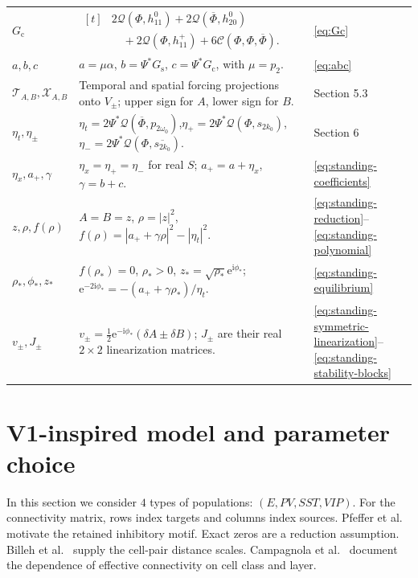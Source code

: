 \documentclass[11pt]{article}
\newcommand{\ii}{\mathrm{i}}
\newcommand{\ee}{\mathrm{e}}
\newcommand{\cQ}{\mathcal{Q}}
\newcommand{\cC}{\mathcal{C}}
\begin{document}
\begin{minipage}{\textwidth}
\begin{tabular}{@{}p{}p{}p{}@{}}
$G_{\mathrm{c}}$ & $\begin{aligned}[t]&2\cQ(\Phi,h_{11}^0)+2\cQ(\overline\Phi,h_{20}^0)\\
&\quad+2\cQ(\Phi,h_{11}^+)+6\cC(\Phi,\Phi,\overline\Phi).\end{aligned}$ & \eqref{eq:Gc} \\
$a,b,c$ & $a=\mu\alpha$, $b=\Psi^*G_{\mathrm{s}}$, $c=\Psi^*G_{\mathrm{c}}$, with $\mu=p_2$. & \eqref{eq:abc} \\
$\mathcal T_{A,B},\mathcal X_{A,B}$ & Temporal and spatial forcing projections onto $V_\pm$; upper sign for $A$, lower sign for $B$. & Section 5.3 \\
$\eta_t,\eta_\pm$ & $\eta_t=2\Psi^*\cQ(\overline\Phi,p_{2\omega_0})$,\newline $\eta_+=2\Psi^*\cQ(\Phi,s_{2k_0})$, $\eta_-=2\Psi^*\cQ(\Phi,\overline{s_{2k_0}})$. & Section 6 \\
$\eta_x,a_+,\gamma$ & $\eta_x=\eta_+=\eta_-$ for real $S$; $a_+=a+\eta_x$, $\gamma=b+c$. & \eqref{eq:standing-coefficients} \\
$z,\rho,f(\rho)$ & $A=B=z$, $\rho=|z|^2$, $f(\rho)=|a_++\gamma\rho|^2-|\eta_t|^2$. & \eqref{eq:standing-reduction}--\eqref{eq:standing-polynomial} \\
$\rho_*,\phi_*,z_*$ & $f(\rho_*)=0$, $\rho_*>0$, $z_*=\sqrt{\rho_*}\ee^{\ii\phi_*}$;\newline $\ee^{-2\ii\phi_*}=-(a_++\gamma\rho_*)/\eta_t$. & \eqref{eq:standing-equilibrium} \\
$v_\pm,J_\pm$ & $v_\pm=\tfrac12\ee^{-\ii\phi_*}(\delta A\pm\delta B)$; $J_\pm$ are their real $2\times2$ linearization matrices. & \eqref{eq:standing-symmetric-linearization}--\eqref{eq:standing-stability-blocks} \\
\bottomrule
\end{tabular}
\par
\endgroup
\end{minipage}
\par\medskip

\clearpage
\section{V1-inspired model and parameter choice}
\label{sec:v1-coefficients}
In this section we consider $4$ types of populations: $(E,PV,SST,VIP)$. For the connectivity matrix, rows index targets and columns
index sources. Pfeffer et al.~\cite{pfeffer2013} motivate the retained
inhibitory motif. Exact zeros are a reduction assumption.
Billeh et al.~\cite{billeh2020} supply the cell-pair distance scales.
Campagnola et al.~\cite{campagnola2022} document the dependence of effective
connectivity on cell class and layer. 
\end{document}
